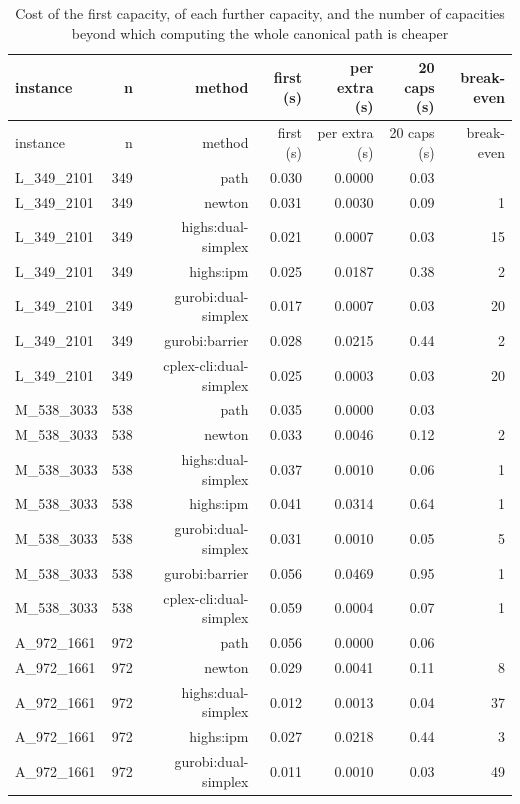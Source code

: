 \begin{longtable}{lrrrrrr}
\caption{Cost of the first capacity, of each further capacity, and the number of capacities beyond which computing the whole canonical path is cheaper}\label{tab:methods}\\
\toprule
instance & n & method & first (s) & per extra (s) & 20 caps (s) & break-even \\
\midrule
\endfirsthead
\toprule
instance & n & method & first (s) & per extra (s) & 20 caps (s) & break-even \\
\midrule
\endhead
\bottomrule
\endfoot
L\_349\_2101 & 349 & path & 0.030 & 0.0000 & 0.03 &  \\
L\_349\_2101 & 349 & newton & 0.031 & 0.0030 & 0.09 & 1 \\
L\_349\_2101 & 349 & highs:dual-simplex & 0.021 & 0.0007 & 0.03 & 15 \\
L\_349\_2101 & 349 & highs:ipm & 0.025 & 0.0187 & 0.38 & 2 \\
L\_349\_2101 & 349 & gurobi:dual-simplex & 0.017 & 0.0007 & 0.03 & 20 \\
L\_349\_2101 & 349 & gurobi:barrier & 0.028 & 0.0215 & 0.44 & 2 \\
L\_349\_2101 & 349 & cplex-cli:dual-simplex & 0.025 & 0.0003 & 0.03 & 20 \\
M\_538\_3033 & 538 & path & 0.035 & 0.0000 & 0.03 &  \\
M\_538\_3033 & 538 & newton & 0.033 & 0.0046 & 0.12 & 2 \\
M\_538\_3033 & 538 & highs:dual-simplex & 0.037 & 0.0010 & 0.06 & 1 \\
M\_538\_3033 & 538 & highs:ipm & 0.041 & 0.0314 & 0.64 & 1 \\
M\_538\_3033 & 538 & gurobi:dual-simplex & 0.031 & 0.0010 & 0.05 & 5 \\
M\_538\_3033 & 538 & gurobi:barrier & 0.056 & 0.0469 & 0.95 & 1 \\
M\_538\_3033 & 538 & cplex-cli:dual-simplex & 0.059 & 0.0004 & 0.07 & 1 \\
A\_972\_1661 & 972 & path & 0.056 & 0.0000 & 0.06 &  \\
A\_972\_1661 & 972 & newton & 0.029 & 0.0041 & 0.11 & 8 \\
A\_972\_1661 & 972 & highs:dual-simplex & 0.012 & 0.0013 & 0.04 & 37 \\
A\_972\_1661 & 972 & highs:ipm & 0.027 & 0.0218 & 0.44 & 3 \\
A\_972\_1661 & 972 & gurobi:dual-simplex & 0.011 & 0.0010 & 0.03 & 49 \\

\end{longtable}

